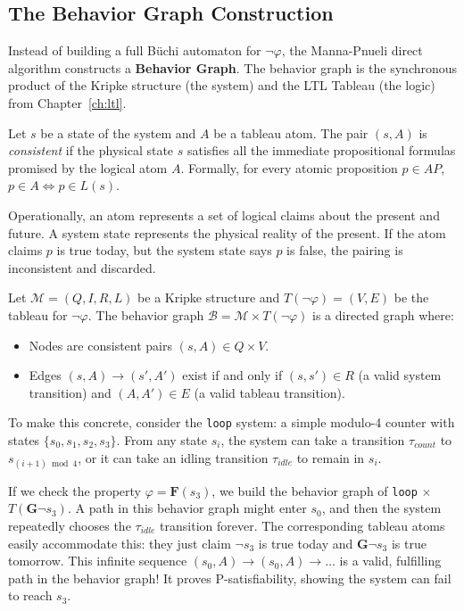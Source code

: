 \subsection{The Behavior Graph Construction}

Instead of building a full Büchi automaton for $\neg\varphi$, the Manna-Pnueli direct algorithm constructs a \textbf{Behavior Graph}. The behavior graph is the synchronous product of the Kripke structure (the system) and the LTL Tableau (the logic) from Chapter~\ref{ch:ltl}. 

\begin{definition}
Let $s$ be a state of the system and $A$ be a tableau atom. The pair $(s, A)$ is \emph{consistent} if the physical state $s$ satisfies all the immediate propositional formulas promised by the logical atom $A$. Formally, for every atomic proposition $p \in AP$, $p \in A \iff p \in L(s)$.
\end{definition}

Operationally, an atom represents a set of logical claims about the present and future. A system state represents the physical reality of the present. If the atom claims $p$ is true today, but the system state says $p$ is false, the pairing is inconsistent and discarded.

\begin{definition}
Let $\mathcal{M} = (Q, I, R, L)$ be a Kripke structure and $T(\neg\varphi) = (V, E)$ be the tableau for $\neg\varphi$. The behavior graph $\mathcal{B} = \mathcal{M} \times T(\neg\varphi)$ is a directed graph where:
\begin{itemize}
  \item Nodes are consistent pairs $(s, A) \in Q \times V$.
  \item Edges $(s, A) \to (s', A')$ exist if and only if $(s, s') \in R$ (a valid system transition) and $(A, A') \in E$ (a valid tableau transition).
\end{itemize}
\end{definition}

\begin{example}
\label{ex:loop-system}
To make this concrete, consider the \texttt{loop} system: a simple modulo-4 counter with states $\{s_0, s_1, s_2, s_3\}$. From any state $s_i$, the system can take a transition $\tau_{count}$ to $s_{(i+1) \bmod 4}$, or it can take an idling transition $\tau_{idle}$ to remain in $s_i$. 

If we check the property $\varphi = \mathbf{F}(s_3)$, we build the behavior graph of \texttt{loop} $\times$ $T(\mathbf{G} \neg s_3)$. 
A path in this behavior graph might enter $s_0$, and then the system repeatedly chooses the $\tau_{idle}$ transition forever. The corresponding tableau atoms easily accommodate this: they just claim $\neg s_3$ is true today and $\mathbf{G} \neg s_3$ is true tomorrow. This infinite sequence $(s_0, A) \to (s_0, A) \to \dots$ is a valid, fulfilling path in the behavior graph! It proves P-satisfiability, showing the system can fail to reach $s_3$.
\end{example}


